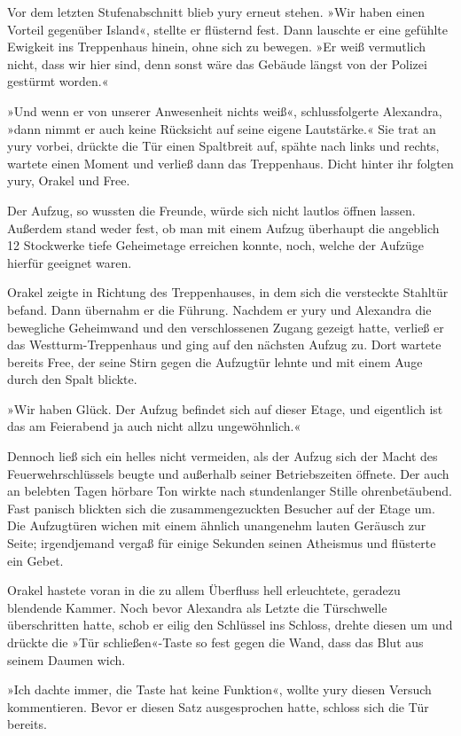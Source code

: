 Vor dem letzten Stufenabschnitt blieb yury erneut stehen. »Wir haben einen Vorteil gegenüber Island«, stellte er flüsternd fest. Dann lauschte er eine gefühlte Ewigkeit ins Treppenhaus hinein, ohne sich zu bewegen. »Er weiß vermutlich nicht, dass wir hier sind, denn sonst wäre das Gebäude längst von der Polizei gestürmt worden.«

»Und wenn er von unserer Anwesenheit nichts weiß«, schlussfolgerte Alexandra, »dann nimmt er auch keine Rücksicht auf seine eigene Lautstärke.« Sie trat an yury vorbei, drückte die Tür einen Spaltbreit auf, spähte nach links und rechts, wartete einen Moment und verließ dann das Treppenhaus. Dicht hinter ihr folgten yury, Orakel und Free.

Der Aufzug, so wussten die Freunde, würde sich nicht lautlos öffnen lassen. Außerdem stand weder fest, ob man mit einem Aufzug überhaupt die angeblich 12 Stockwerke tiefe Geheimetage erreichen konnte, noch, welche der Aufzüge hierfür geeignet waren.

Orakel zeigte in Richtung des Treppenhauses, in dem sich die versteckte Stahltür befand. Dann übernahm er die Führung. Nachdem er yury und Alexandra die bewegliche Geheimwand und den verschlossenen Zugang gezeigt hatte, verließ er das Westturm-Treppenhaus und ging auf den nächsten Aufzug zu. Dort wartete bereits Free, der seine Stirn gegen die Aufzugtür lehnte und mit einem Auge durch den Spalt blickte.

»Wir haben Glück. Der Aufzug befindet sich auf dieser Etage, und eigentlich ist das am Feierabend ja auch nicht allzu ungewöhnlich.«

Dennoch ließ sich ein helles  nicht vermeiden, als der Aufzug sich der Macht des Feuerwehrschlüssels beugte und außerhalb seiner Betriebszeiten öffnete. Der auch an belebten Tagen hörbare Ton wirkte nach stundenlanger Stille ohrenbetäubend. Fast panisch blickten sich die zusammengezuckten Besucher auf der Etage um. Die Aufzugtüren wichen mit einem ähnlich unangenehm lauten Geräusch zur Seite; irgendjemand vergaß für einige Sekunden seinen Atheismus und flüsterte ein Gebet.

Orakel hastete voran in die zu allem Überfluss hell erleuchtete, geradezu blendende Kammer. Noch bevor Alexandra als Letzte die Türschwelle überschritten hatte, schob er eilig den Schlüssel ins Schloss, drehte diesen um und drückte die »Tür schließen«-Taste so fest gegen die Wand, dass das Blut aus seinem Daumen wich.

»Ich dachte immer, die Taste hat keine Funktion«, wollte yury diesen Versuch kommentieren. Bevor er diesen Satz ausgesprochen hatte, schloss sich die Tür bereits.

